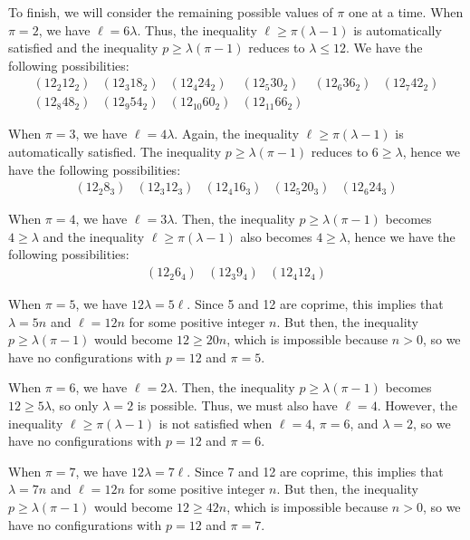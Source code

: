 \documentclass[12pt]{article}
\begin{document}
To finish, we will consider the remaining possible values of $\pi$ 
one at  a time.  When $\pi = 2$, we have $\ell = 6 \lambda$.
Thus, the inequality $\ell \ge \pi (\lambda - 1)$ is automatically
satisfied and the inequality $p \ge \lambda (\pi - 1)$ reduces to
$\lambda \le 12$.  We have the following possibilities:
\[ \begin{matrix}
 (12_2 12_2) & (12_3 18_2) & (12_4 24_2) &
 (12_5 30_2) & (12_6 36_2) & (12_7 42_2) \\
 (12_8 48_2) & (12_9 54_2) & 
 (12_{10} 60_2) & (12_{11} 66_2)
\end{matrix} \]

When $\pi = 3$, we have $\ell = 4 \lambda$.  Again, the inequality 
$\ell \ge \pi (\lambda - 1)$ is automatically satisfied.  The
inequality $p \ge \lambda (\pi - 1)$ reduces to $6 \ge \lambda$,
hence we have the following possibilities:
\[ \begin{matrix}
 (12_2 8_3) & (12_3 12_3) & (12_4 16_3) &
 (12_5 20_3) & (12_6 24_3)
\end{matrix} \]

When $\pi = 4$, we have $\ell = 3 \lambda$.  Then, the inequality
$p \ge \lambda (\pi - 1)$ becomes $4 \ge \lambda$ and the inequality
$\ell \ge \pi (\lambda - 1)$ also becomes $4 \ge \lambda$, hence we
have the following possibilities:
\[ \begin{matrix}
 (12_2 6_4) & (12_3 9_4) & (12_4 12_4)
\end{matrix} \] 

When $\pi = 5$, we have $12 \lambda = 5 \ell$.  Since 5 and 12 are
coprime, this implies that $\lambda = 5 n$ and $\ell = 12 n$ for
some positive integer $n$.  But then, the inequality $p \ge \lambda
(\pi - 1)$ would become $12 \ge 20 n$, which is impossible because
$n > 0$, so we have no configurations with $p = 12$ and $\pi = 5$.

When $\pi = 6$, we have $\ell = 2 \lambda$.  Then, the inequality
$p \ge \lambda (\pi - 1)$ becomes $12 \ge 5 \lambda$, so only
$\lambda = 2$ is possible.  Thus, we must also have $\ell = 4$.
However, the inequality $\ell \ge \pi (\lambda - 1)$ is not satisfied
when $\ell = 4$, $\pi = 6$, and $\lambda = 2$, so we have no
configurations with $p = 12$ and $\pi = 6$.

When $\pi = 7$, we have $12 \lambda = 7 \ell$.  Since 7 and 12 are
coprime, this implies that $\lambda = 7 n$ and $\ell = 12 n$ for
some positive integer $n$.  But then, the inequality $p \ge \lambda
(\pi - 1)$ would become $12 \ge 42 n$, which is impossible because
$n > 0$, so we have no configurations with $p = 12$ and $\pi = 7$.
\end{document}
